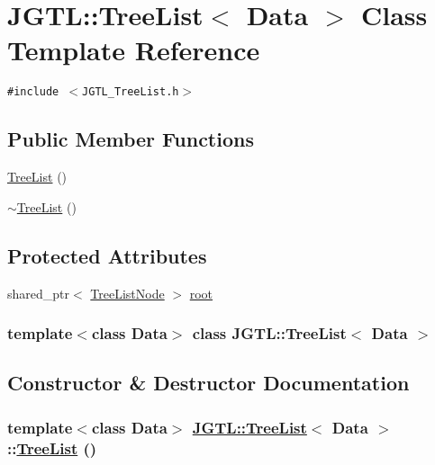 \hypertarget{class_j_g_t_l_1_1_tree_list}{
\section{JGTL::Tree\-List$<$ Data $>$ Class Template Reference}
\label{class_j_g_t_l_1_1_tree_list}
}
{\tt \#include $<$JGTL\_\-Tree\-List.h$>$}

\subsection*{Public Member Functions}
\begin{CompactItemize}
\item 
\hyperlink{class_j_g_t_l_1_1_tree_list_448d1c17cb147cf0932da584a505c944}{Tree\-List} ()
\item 
\hyperlink{class_j_g_t_l_1_1_tree_list_dea76f406f9581d8a12866b15e7d4e4a}{$\sim$Tree\-List} ()
\end{CompactItemize}
\subsection*{Protected Attributes}
\begin{CompactItemize}
\item 
shared\_\-ptr$<$ \hyperlink{class_j_g_t_l_1_1_tree_list_node}{Tree\-List\-Node} $>$ \hyperlink{class_j_g_t_l_1_1_tree_list_dc1670851d8184e4f482627cbc7aaf6a}{root}
\end{CompactItemize}
\subsubsection*{template$<$class Data$>$ class JGTL::Tree\-List$<$ Data $>$}



\subsection{Constructor \& Destructor Documentation}
\hypertarget{class_j_g_t_l_1_1_tree_list_448d1c17cb147cf0932da584a505c944}{
\subsubsection[TreeList]{\setlength{\rightskip}{0pt plus 5cm}template$<$class Data$>$ \hyperlink{class_j_g_t_l_1_1_tree_list}{JGTL::Tree\-List}$<$ Data $>$::\hyperlink{class_j_g_t_l_1_1_tree_list}{Tree\-List} ()}}
\label{class_j_g_t_l_1_1_tree_list_448d1c17cb147cf0932da584a505c944}


